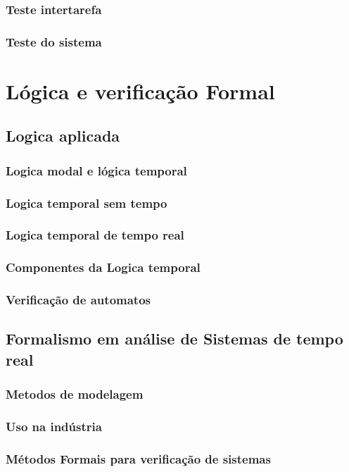 \documentclass{article}
\begin{document}
		\subsubsection{Teste intertarefa}
		\subsubsection{Teste do sistema}
\newpage

\section{Lógica e verificação Formal}
	\subsection{Logica aplicada}
		\subsubsection{Logica modal e lógica temporal}
		\subsubsection{Logica temporal sem tempo}
		\subsubsection{Logica temporal de tempo real}
		\subsubsection{Componentes da Logica temporal}
		\subsubsection{Verificação de automatos}
	\subsection{Formalismo em análise de Sistemas de tempo real}
		\subsubsection{Metodos de modelagem}
		\subsubsection{Uso na indústria}
		\subsubsection{Métodos Formais para verificação de sistemas}
\end{document}
